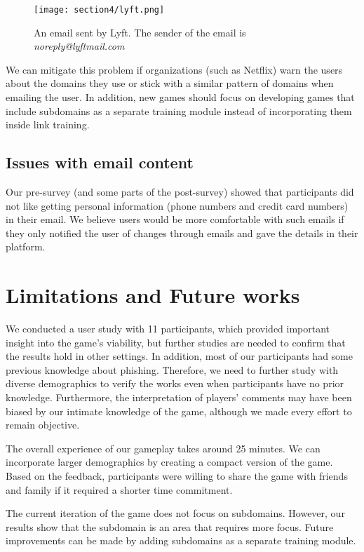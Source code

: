 \begin{figure}
    \centering
    \texttt{[image: section4/lyft.png]}
    \caption[An email sent by Lyft]{An email sent by Lyft. The sender of the email is \textit{noreply@lyftmail.com}}
    \label{fig:lyft}
\end{figure}

We can mitigate this problem if organizations (such as Netflix) warn the users about the domains they use or stick with a similar pattern of domains when emailing the user. In addition, new games should focus on developing games that include subdomains as a separate training module instead of incorporating them inside link training.

\subsection{Issues with email content}
Our pre-survey (and some parts of the post-survey) showed that participants did not like getting personal information (phone numbers and credit card numbers) in their email. We believe users would be more comfortable with such emails if they only notified the user of changes through emails and gave the details in their platform.

\section{Limitations and Future works}
We conducted a user study with 11 participants, which provided important insight into the game's viability, but further studies are needed to confirm that the results hold in other settings. In addition, most of our participants had some previous knowledge about phishing. Therefore, we need to further study with diverse demographics to verify the works even when participants have no prior knowledge. Furthermore, the interpretation of players' comments may have been biased by our intimate knowledge of the game, although we made every effort to remain objective.

The overall experience of our gameplay takes around 25 minutes. We can incorporate larger demographics by creating a compact version of the game. Based on the feedback, participants were willing to share the game with friends and family if it required a shorter time commitment.

The current iteration of the game does not focus on subdomains. However, our results show that the subdomain is an area that requires more focus. Future improvements can be made by adding subdomains as a separate training module.


